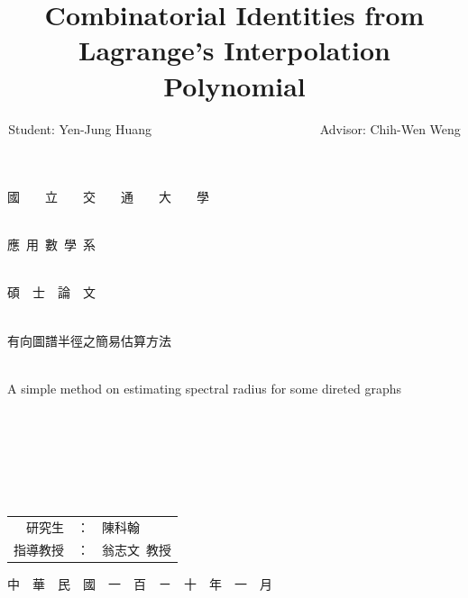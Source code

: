 \documentclass{article}
\title{Combinatorial Identities from Lagrange's Interpolation Polynomial}
\author{Student: Yen-Jung Huang  ~~~~~~~~~~~~~~~~~~~~~~~~~~Advisor: Chih-Wen Weng}
\date{} %
\theoremstyle{plain}
\theoremstyle{definition}
\begin{document}

\thispagestyle{empty}
\begin{center}
{ \Huge 國~~~~立~~~~交~~~~通~~~~大~~~~學}~\\~\\

\bigskip

{ \Huge 應~用~數~學~系}~\\~\\

\bigskip

{ \Huge 碩~~士~~論~~文}~\\~\\

\bigskip \bigskip\bigskip\bigskip\bigskip\bigskip

{ \Huge 有向圖譜半徑之簡易估算方法}~\\~\\

\bigskip

{ \Huge A simple method on estimating spectral radius for some direted graphs}~\\~\\
~\\~\\~\\~\\~\\
\bigskip \bigskip\bigskip\bigskip\bigskip\bigskip
\bigskip \bigskip\bigskip\bigskip\bigskip\bigskip
\bigskip\bigskip\bigskip

{ \Large
\begin{tabular}{rcl}
研究生&：&陳科翰\\
指導教授&：&翁志文~教授
\end{tabular} }

\bigskip\bigskip
{ \Large 中~~華~~民~~國~~一~~百~~ㄧ~~十~~年~~一~~月 }
\large
\end{center}
\pagebreak
\end{document}
